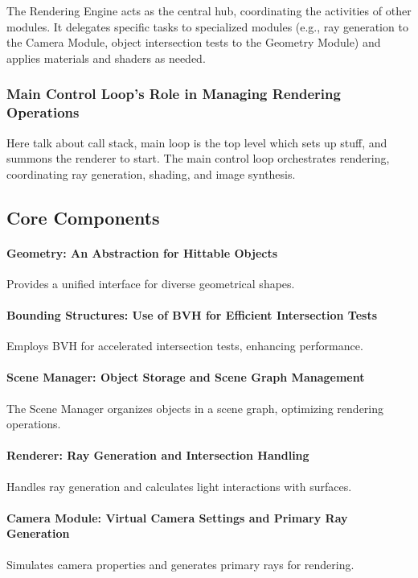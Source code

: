 \documentclass[12pt]{article}
\begin{document}
The Rendering Engine acts as the central hub, coordinating the activities of other modules. It delegates specific tasks to specialized modules (e.g., ray generation to the Camera Module, object intersection tests to the Geometry Module) and applies materials and shaders as needed.

\subsubsection{Main Control Loop's Role in Managing Rendering Operations}
Here talk about call stack, main loop is the top level which sets up stuff, and summons the renderer to start.
The main control loop orchestrates rendering, coordinating ray generation, shading, and image synthesis.

\subsection{Core Components}

\paragraph{Geometry: An Abstraction for Hittable Objects} Provides a unified interface for diverse geometrical shapes.

\paragraph{Bounding Structures: Use of BVH for Efficient Intersection Tests}
Employs BVH for accelerated intersection tests, enhancing performance.

\paragraph{Scene Manager: Object Storage and Scene Graph Management}
The Scene Manager organizes objects in a scene graph, optimizing rendering operations.

\paragraph{Renderer: Ray Generation and Intersection Handling}
Handles ray generation and calculates light interactions with surfaces.

\paragraph{Camera Module: Virtual Camera Settings and Primary Ray Generation}
Simulates camera properties and generates primary rays for rendering.
\end{document}
